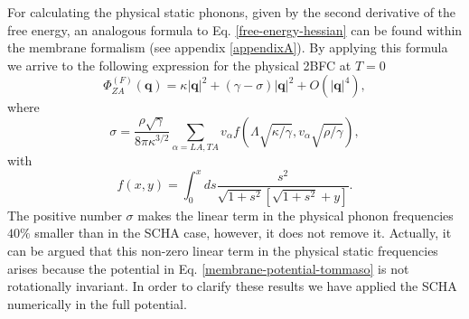 For calculating the physical static phonons, given by the second derivative of the free energy, an analogous formula 
to Eq. \ref{free-energy-hessian} can be found within the membrane formalism (see appendix \ref{appendixA}). By 
applying this formula we arrive to the following expression for the physical 2BFC at $T=0$
\begin{equation}
 \Phi_{ZA}^{(F)}(\boldsymbol{q})=\kappa|\boldsymbol{q}|^{2}+(\gamma-\sigma)|\boldsymbol{q}|^{2}+
 O(|\boldsymbol{q}|^{4}),
\end{equation}
where
\begin{equation}
\sigma=\frac{\rho\sqrt{\gamma}}{8\pi\kappa^{3/2}}\sum_{\alpha=LA,TA}v_{\alpha}f(\Lambda\sqrt{\kappa/\gamma},v_{\alpha}\sqrt{\rho/\gamma}),
\end{equation}
with
\begin{equation}
f(x,y)=\int_{0}^{x}ds\frac{s^{2}}{\sqrt{1+s^{2}}[\sqrt{1+s^{2}}+y]}.
\end{equation}
The positive number $\sigma$ makes the linear term in the physical 
phonon frequencies $40\%$ smaller than in the SCHA case, however, it does not remove it. Actually, it can be argued 
that this non-zero linear term in the physical static frequencies arises because the potential in 
Eq. \ref{membrane-potential-tommaso} is not rotationally invariant. In order to clarify these results we have 
applied the SCHA numerically in the full potential. \\

